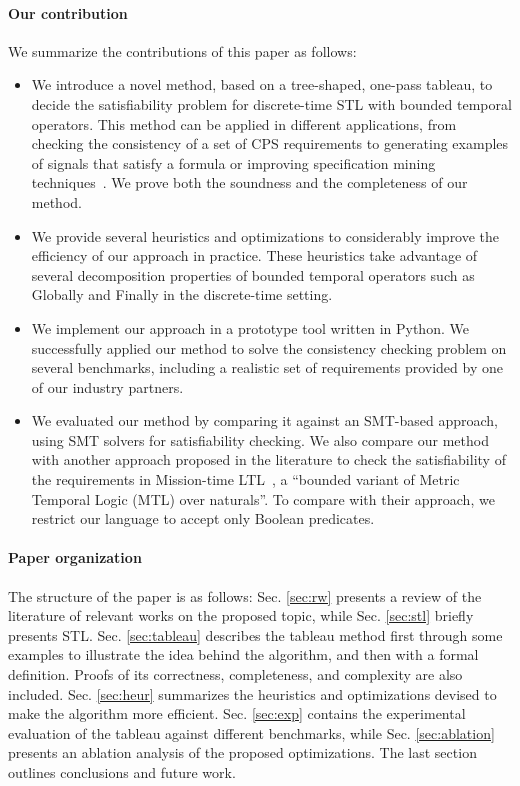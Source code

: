 \documentclass[acmsmall,screen]{acmart}
\begin{document}
\paragraph{Our contribution} We summarize the contributions of this paper as follows:
\begin{itemize}
\item We introduce a novel method, based on a tree-shaped, one-pass tableau, to decide the satisfiability problem for discrete-time STL with bounded temporal operators. This method can be applied in different applications, from checking the consistency of a set of CPS requirements to generating examples of signals that satisfy a formula or improving specification mining techniques~\cite{BartocciMNN22}.  We prove both the soundness and the completeness of our method.
\item We provide several heuristics and optimizations to considerably improve the efficiency of our approach in practice. These heuristics take advantage of several decomposition properties of bounded temporal operators such as Globally and Finally in the discrete-time setting.
\item We implement our approach in a prototype tool written in Python. We successfully applied our method to solve the consistency checking problem on several benchmarks, including a realistic set of requirements provided by one of our industry partners.
\item We evaluated our method by comparing it against an SMT-based approach, using SMT solvers for satisfiability checking.  We also compare our method with another approach proposed in the literature to check the satisfiability of the requirements
in Mission-time LTL~\cite{LiVR22}, a ``bounded variant of Metric Temporal Logic (MTL) over naturals''. To compare with their approach, we restrict our language to accept only Boolean predicates. 
\end{itemize}

\paragraph{Paper organization}
The structure of the paper is as follows:
Sec. \ref{sec:rw} presents a review of the literature of relevant works on the proposed topic, while Sec. \ref{sec:stl} briefly presents STL.
Sec. \ref{sec:tableau} describes the tableau method first through some examples to illustrate the idea behind the algorithm, and then with a formal definition. Proofs of its correctness, completeness, and complexity are also included.
Sec. \ref{sec:heur} summarizes the heuristics and optimizations devised to make the algorithm more efficient. Sec. \ref{sec:exp} contains the experimental evaluation of the tableau against different benchmarks, while Sec. \ref{sec:ablation} presents an ablation analysis of the proposed optimizations. The last section outlines conclusions and future work.
\end{document}
